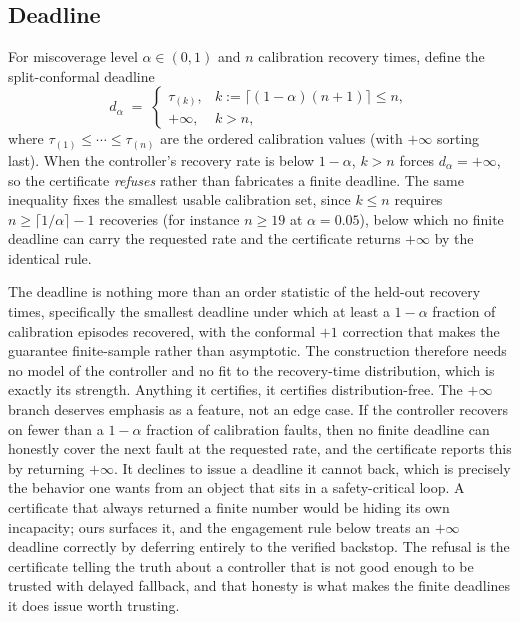 \documentclass[11pt]{article}
\theoremstyle{plain}
\theoremstyle{definition}
\newcommand{\dalpha}{d_{\alpha}}
\begin{document}
\subsection{Deadline} For miscoverage level $\alpha\in(0,1)$ and $n$ calibration recovery
times, define the split-conformal deadline
\begin{equation}
  \label{eq:deadline}
  \dalpha \;=\;
  \begin{cases}
    \tau_{(k)}, & k := \lceil (1-\alpha)(n+1)\rceil \le n,\\
    +\infty, & k > n,
  \end{cases}
\end{equation}
where $\tau_{(1)}\le\cdots\le\tau_{(n)}$ are the ordered calibration values (with $+\infty$
sorting last). When the controller's recovery rate is below $1-\alpha$, $k>n$ forces
$\dalpha=+\infty$, so the certificate \emph{refuses} rather than fabricates a finite
deadline. The same inequality fixes the smallest usable calibration set, since $k\le n$
requires $n\ge\lceil1/\alpha\rceil-1$ recoveries (for instance $n\ge19$ at $\alpha=0.05$),
below which no finite deadline can carry the requested rate and the certificate returns
$+\infty$ by the identical rule.

The deadline is nothing more than an order statistic of the held-out recovery times,
specifically the smallest deadline under which at least a $1-\alpha$ fraction of calibration
episodes recovered, with the conformal $+1$ correction that makes the guarantee
finite-sample rather than asymptotic. The construction therefore needs no model of the
controller and no fit to the recovery-time distribution, which is exactly its strength.
Anything it certifies, it certifies distribution-free. The $+\infty$ branch deserves emphasis
as a feature, not an edge case. If the controller recovers on fewer than a $1-\alpha$
fraction of calibration faults, then no finite deadline can honestly cover the next fault at
the requested rate, and the certificate reports this by returning $+\infty$. It declines to
issue a deadline it cannot back, which is precisely the behavior one wants from an object that
sits in a safety-critical loop. A certificate that always returned a finite number would be
hiding its own incapacity; ours surfaces it, and the engagement rule below treats an
$+\infty$ deadline correctly by deferring entirely to the verified backstop. The refusal is
the certificate telling the truth about a controller that is not good enough to be trusted
with delayed fallback, and that honesty is what makes the finite deadlines it does issue
worth trusting.
\end{document}
